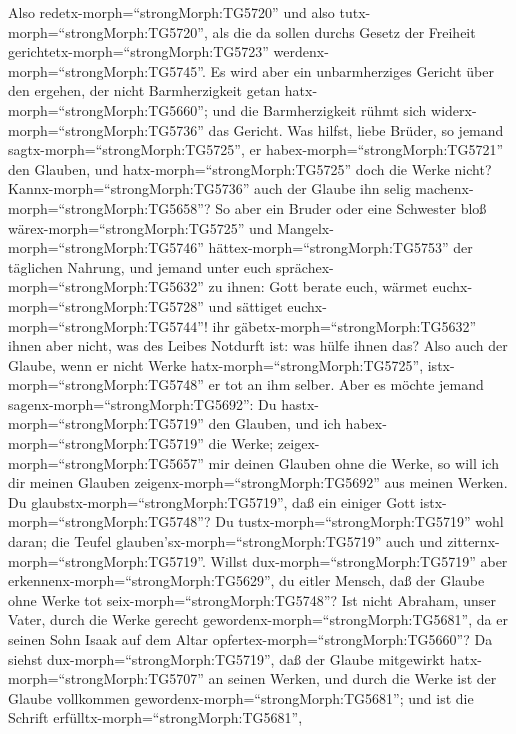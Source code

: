  Also redetx-morph=``strongMorph:TG5720'' und also
tutx-morph=``strongMorph:TG5720'', als die da sollen durchs Gesetz der
Freiheit gerichtetx-morph=``strongMorph:TG5723''
werdenx-morph=``strongMorph:TG5745''.  Es wird aber ein
unbarmherziges Gericht über den ergehen, der nicht Barmherzigkeit getan
hatx-morph=``strongMorph:TG5660''; und die Barmherzigkeit rühmt sich
widerx-morph=``strongMorph:TG5736'' das Gericht.  Was
hilfst, liebe Brüder, so jemand sagtx-morph=``strongMorph:TG5725'', er
habex-morph=``strongMorph:TG5721'' den Glauben, und
hatx-morph=``strongMorph:TG5725'' doch die Werke nicht?
Kannx-morph=``strongMorph:TG5736'' auch der Glaube ihn selig
machenx-morph=``strongMorph:TG5658''?  So aber ein Bruder
oder eine Schwester bloß wärex-morph=``strongMorph:TG5725'' und
Mangelx-morph=``strongMorph:TG5746'' hättex-morph=``strongMorph:TG5753''
der täglichen Nahrung,  und jemand unter euch
sprächex-morph=``strongMorph:TG5632'' zu ihnen: Gott berate euch, wärmet
euchx-morph=``strongMorph:TG5728'' und sättiget
euchx-morph=``strongMorph:TG5744''! ihr
gäbetx-morph=``strongMorph:TG5632'' ihnen aber nicht, was des Leibes
Notdurft ist: was hülfe ihnen das?  Also auch der Glaube,
wenn er nicht Werke hatx-morph=``strongMorph:TG5725'',
istx-morph=``strongMorph:TG5748'' er tot an ihm selber. 
Aber es möchte jemand sagenx-morph=``strongMorph:TG5692'': Du
hastx-morph=``strongMorph:TG5719'' den Glauben, und ich
habex-morph=``strongMorph:TG5719'' die Werke;
zeigex-morph=``strongMorph:TG5657'' mir deinen Glauben ohne die Werke,
so will ich dir meinen Glauben zeigenx-morph=``strongMorph:TG5692'' aus
meinen Werken.  Du glaubstx-morph=``strongMorph:TG5719'',
daß ein einiger Gott istx-morph=``strongMorph:TG5748''? Du
tustx-morph=``strongMorph:TG5719'' wohl daran; die Teufel
glauben'sx-morph=``strongMorph:TG5719'' auch und
zitternx-morph=``strongMorph:TG5719''.  Willst
dux-morph=``strongMorph:TG5719'' aber
erkennenx-morph=``strongMorph:TG5629'', du eitler Mensch, daß der Glaube
ohne Werke tot seix-morph=``strongMorph:TG5748''?  Ist
nicht Abraham, unser Vater, durch die Werke gerecht
gewordenx-morph=``strongMorph:TG5681'', da er seinen Sohn Isaak auf dem
Altar opfertex-morph=``strongMorph:TG5660''?  Da siehst
dux-morph=``strongMorph:TG5719'', daß der Glaube mitgewirkt
hatx-morph=``strongMorph:TG5707'' an seinen Werken, und durch die Werke
ist der Glaube vollkommen gewordenx-morph=``strongMorph:TG5681'';
 und ist die Schrift erfülltx-morph=``strongMorph:TG5681'',
